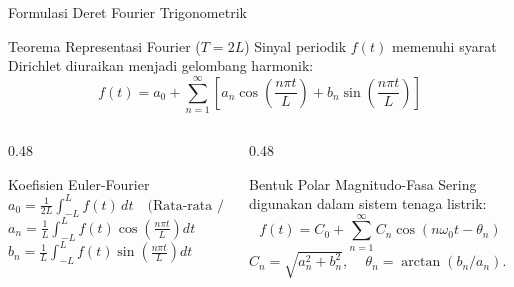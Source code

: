 \documentclass[aspectratio=169,10pt]{beamer}
\begin{document}
\begin{frame}{Formulasi Deret Fourier Trigonometrik}
  \begin{block}{Teorema Representasi Fourier ($T = 2L$)}
    \small
    Sinyal periodik $f(t)$ memenuhi syarat Dirichlet diuraikan menjadi gelombang harmonik:
    \begin{equation*}
      f(t) = a_0 + \sum_{n=1}^{\infty} \left[ a_n \cos\left(\frac{n\pi t}{L}\right) + b_n \sin\left(\frac{n\pi t}{L}\right) \right]
    \end{equation*}
  \end{block}
  \begin{columns}[t]
    \begin{column}{0.48\textwidth}
      \begin{alertblock}{Koefisien Euler-Fourier}
        \small
        $a_0 = \frac{1}{2L} \int_{-L}^{L} f(t) \, dt \quad \text{(Rata-rata / DC)}$\\[2pt]
        $a_n = \frac{1}{L} \int_{-L}^{L} f(t) \cos\left(\frac{n\pi t}{L}\right) dt$\\[2pt]
        $b_n = \frac{1}{L} \int_{-L}^{L} f(t) \sin\left(\frac{n\pi t}{L}\right) dt$
      \end{alertblock}
    \end{column}
    \begin{column}{0.48\textwidth}
      \begin{exampleblock}{Bentuk Polar Magnitudo-Fasa}
        \small
        Sering digunakan dalam sistem tenaga listrik:
        \begin{equation*}
          f(t) = C_0 + \sum_{n=1}^{\infty} C_n \cos(n\omega_0 t - \theta_n)
        \end{equation*}
        $C_n = \sqrt{a_n^2 + b_n^2}$, $\quad \theta_n = \arctan(b_n / a_n)$.
      \end{exampleblock}
    \end{column}
  \end{columns}
\end{frame}
\end{document}

